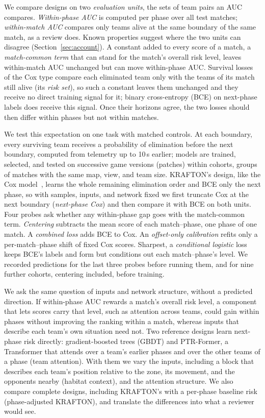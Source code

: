 \documentclass[sigconf,anonymous]{acmart}
\begin{document}
We compare designs on two \emph{evaluation units}, the sets of team pairs an AUC compares. \emph{Within-phase AUC} is computed per phase over all test matches; \emph{within-match AUC} compares only teams alive at the same boundary of the same match, as a review does. Known properties suggest where the two units can disagree (Section~\ref{sec:account}). A constant added to every score of a match, a \emph{match-common term} that can stand for the match's overall risk level, leaves within-match AUC unchanged but can move within-phase AUC. Survival losses of the Cox type compare each eliminated team only with the teams of its match still alive (its \emph{risk set}), so such a constant leaves them unchanged and they receive no direct training signal for it; binary cross-entropy (BCE) on next-phase labels does receive this signal. Once their horizons agree, the two losses should then differ within phases but not within matches.

We test this expectation on one task with matched controls. At each boundary, every surviving team receives a probability of elimination before the next boundary, computed from telemetry up to 10\,s earlier; models are trained, selected, and tested on successive game versions (patches) within cohorts, groups of matches with the same map, view, and team size. KRAFTON's design, like the Cox model~\cite{Cox72}, learns the whole remaining elimination order and BCE only the next phase, so with samples, inputs, and network fixed we first truncate Cox at the next boundary (\emph{next-phase Cox}) and then compare it with BCE on both units. Four probes ask whether any within-phase gap goes with the match-common term. \emph{Centering} subtracts the mean score of each match--phase, one phase of one match. A \emph{combined loss} adds BCE to Cox. An \emph{offset-only calibration} refits only a per-match--phase shift of fixed Cox scores. Sharpest, a \emph{conditional logistic} loss keeps BCE's labels and form but conditions out each match--phase's level. We recorded predictions for the last three probes before running them, and for nine further cohorts, centering included, before training.

We ask the same question of inputs and network structure, without a predicted direction. If within-phase AUC rewards a match's overall risk level, a component that lets scores carry that level, such as attention across teams, could gain within phases without improving the ranking within a match, whereas inputs that describe each team's own situation need not. Two reference designs learn next-phase risk directly: gradient-boosted trees (GBDT) and PTR-Former, a Transformer that attends over a team's earlier phases and over the other teams of a phase (team attention). With them we vary the inputs, including a block that describes each team's position relative to the zone, its movement, and the opponents nearby (habitat context), and the attention structure. We also compare complete designs, including KRAFTON's with a per-phase baseline risk (phase-adjusted KRAFTON), and translate the differences into what a reviewer would see.
\end{document}
